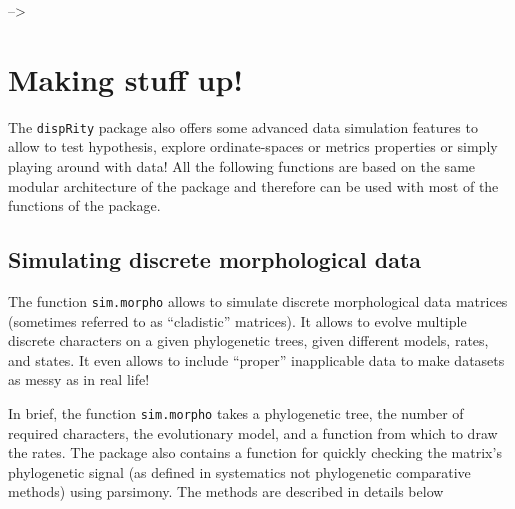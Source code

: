 \documentclass[
]{book}
\begin{document}
--\textgreater{}

\hypertarget{making-stuff-up}{%
\chapter{Making stuff up!}\label{making-stuff-up}}

The \texttt{dispRity} package also offers some advanced data simulation features to allow to test hypothesis, explore ordinate-spaces or metrics properties or simply playing around with data!
All the following functions are based on the same modular architecture of the package and therefore can be used with most of the functions of the package.

\hypertarget{simulating-discrete-morphological-data}{%
\section{Simulating discrete morphological data}\label{simulating-discrete-morphological-data}}

The function \texttt{sim.morpho} allows to simulate discrete morphological data matrices (sometimes referred to as ``cladistic'' matrices).
It allows to evolve multiple discrete characters on a given phylogenetic trees, given different models, rates, and states.
It even allows to include ``proper'' inapplicable data to make datasets as messy as in real life!

In brief, the function \texttt{sim.morpho} takes a phylogenetic tree, the number of required characters, the evolutionary model, and a function from which to draw the rates.
The package also contains a function for quickly checking the matrix's phylogenetic signal (as defined in systematics not phylogenetic comparative methods) using parsimony.
The methods are described in details below
\end{document}
